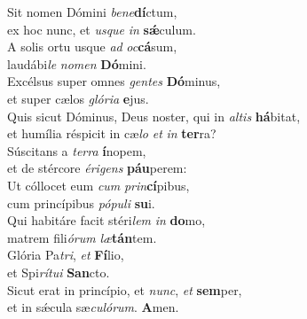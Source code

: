 \evenverse Sit nomen Dómini \textit{be}\textit{ne}\textbf{dí}ctum,~\*\\
\evenverse ex hoc nunc, et \textit{us}\textit{que} \textit{in} \textbf{sǽ}culum.\\
\oddverse A solis ortu usque \textit{ad} \textit{oc}\textbf{cá}sum,~\*\\
\oddverse laudábi\textit{le} \textit{no}\textit{men} \textbf{Dó}mini.\\
\evenverse Excélsus super omnes \textit{gen}\textit{tes} \textbf{Dó}minus,~\*\\
\evenverse et super cælos \textit{gló}\textit{ri}\textit{a} \textbf{e}jus.\\
\oddverse Quis sicut Dóminus, Deus noster, qui in \textit{al}\textit{tis} \textbf{há}bitat,~\*\\
\oddverse et humília réspicit in cæ\textit{lo} \textit{et} \textit{in} \textbf{ter}ra?\\
\evenverse Súscitans a \textit{ter}\textit{ra} \textbf{í}nopem,~\*\\
\evenverse et de stércore \textit{é}\textit{ri}\textit{gens} \textbf{páu}perem:\\
\oddverse Ut cóllocet eum \textit{cum} \textit{prin}\textbf{cí}pibus,~\*\\
\oddverse cum princípibus \textit{pó}\textit{pu}\textit{li} \textbf{su}i.\\
\evenverse Qui habitáre facit stéri\textit{lem} \textit{in} \textbf{do}mo,~\*\\
\evenverse matrem fili\textit{ó}\textit{rum} \textit{læ}\textbf{tán}tem.\\
\oddverse Glória Pa\textit{tri}, \textit{et} \textbf{Fí}lio,~\*\\
\oddverse et Spi\textit{rí}\textit{tu}\textit{i} \textbf{San}cto.\\
\evenverse Sicut erat in princípio, et \textit{nunc}, \textit{et} \textbf{sem}per,~\*\\
\evenverse et in sǽcula sæ\textit{cu}\textit{ló}\textit{rum}. \textbf{A}men.\\
